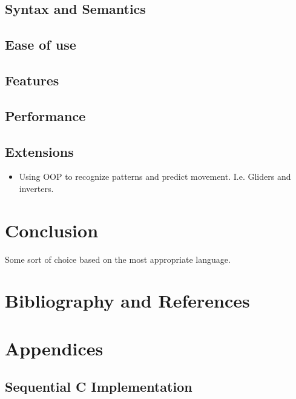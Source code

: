 \documentclass[11pt]{article} %
\begin{document}
\subsection{Syntax and Semantics}
\subsection{Ease of use}
\subsection{Features}
\subsection{Performance}
\subsection{Extensions}
\begin{itemize}
\item Using OOP to recognize patterns and predict movement. I.e. Gliders and inverters.
\end{itemize}
\section{Conclusion}
Some sort of choice based on the most appropriate language.
\section{Bibliography and References}
\nocite{ref1}
\nocite{ref2}
\nocite{ref4}
\nocite{ref5}
\nocite{ref6}


\appendix
\section{Appendices}
\subsection{Sequential C Implementation}

\end{document}

